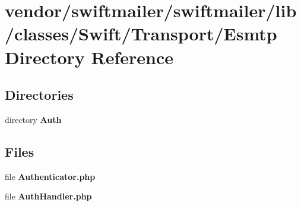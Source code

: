 \section{vendor/swiftmailer/swiftmailer/lib/classes/\+Swift/\+Transport/\+Esmtp Directory Reference}
\label{dir_c94e1dd74f5e9f2d8ad55de6f851cf1f}
\subsection*{Directories}
\begin{DoxyCompactItemize}
\item 
directory {\bf Auth}
\end{DoxyCompactItemize}
\subsection*{Files}
\begin{DoxyCompactItemize}
\item 
file {\bf Authenticator.\+php}
\item 
file {\bf Auth\+Handler.\+php}
\end{DoxyCompactItemize}
